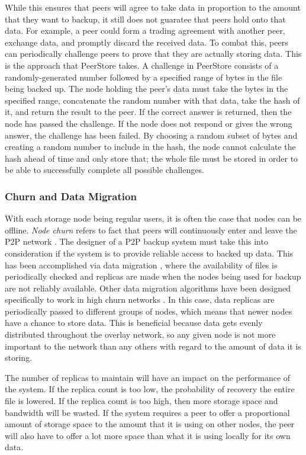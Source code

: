 \documentclass[a4paper]{article}
\begin{document}
While this ensures that peers will agree to take data in proportion to the amount that they want to backup, it still does not guaratee that peers hold onto that data. For example, a peer could form a trading agreement with another peer, exchange data, and promptly discard the received data. To combat this, peers can periodically challenge peers to prove that they are actually storing data. This is the approach that PeerStore takes. A challenge in PeerStore consists of a randomly-generated number followed by a specified range of bytes in the file being backed up. The node holding the peer's data must take the bytes in the specified range, concatenate the random number with that data, take the hash of it, and return the result to the peer. If the correct answer is returned, then the node has passed the challenge. If the node does not respond or gives the wrong answer, the challenge has been failed. By choosing a random subset of bytes and creating a random number to include in the hash, the node cannot calculate the hash ahead of time and only store that; the whole file must be stored in order to be able to successfully complete all possible challenges.

\subsubsection{Churn and Data Migration}
With each storage node being regular users, it is often the case that nodes can be offline. \textit{Node churn} refers to fact that peers will continuously enter and leave the P2P network \cite{StorageSearchP2PNetworks}. The designer of a P2P backup system must take this into consideration if the system is to provide reliable access to backed up data. This has been accomplished via data migration \cite{pStore,PeerStore}, where the availability of files is periodically checked and replicas are made when the nodes being used for backup are not reliably available. Other data migration algorithms have been designed specifically to work in high churn networks \cite{StorageSearchP2PNetworks}. In this case, data replicas are periodically passed to different groups of nodes, which means that newer nodes have a chance to store data. This is beneficial because data gets evenly distributed throughout the overlay network, so any given node is not more important to the network than any others with regard to the amount of data it is storing.

The number of replicas to maintain will have an impact on the performance of the system. If the replica count is too low, the probability of recovery the entire file is lowered. If the replica count is too high, then more storage space and bandwidth will be wasted. If the system requires a peer to offer a proportional amount of storage space to the amount that it is using on other nodes, the peer will also have to offer a lot more space than what it is using locally for its own data.
\end{document}
